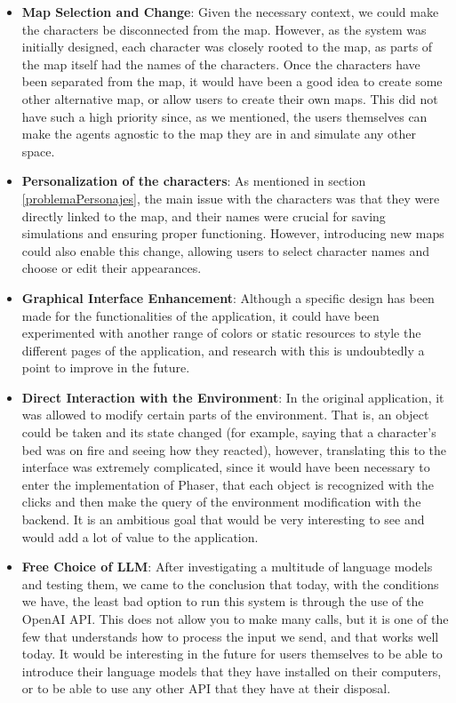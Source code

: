\begin{itemize}
	\item \textbf{Map Selection and Change}: Given the necessary context, we could make the characters be disconnected from the map. However, as the system was initially designed, each character was closely rooted to the map, as parts of the map itself had the names of the characters. Once the characters have been separated from the map, it would have been a good idea to create some other alternative map, or allow users to create their own maps. This did not have such a high priority since, as we mentioned, the users themselves can make the agents agnostic to the map they are in and simulate any other space.
	
	\item \textbf{Personalization of the characters}: As mentioned in section \ref{problemaPersonajes}, the main issue with the characters was that they were directly linked to the map, and their names were crucial for saving simulations and ensuring proper functioning. However, introducing new maps could also enable this change, allowing users to select character names and choose or edit their appearances.
	
	\item \textbf{Graphical Interface Enhancement}: Although a specific design has been made for the functionalities of the application, it could have been experimented with another range of colors or static resources to style the different pages of the application, and research with this is undoubtedly a point to improve in the future.
	
	\item \textbf{Direct Interaction with the Environment}: In the original application, it was allowed to modify certain parts of the environment. That is, an object could be taken and its state changed (for example, saying that a character's bed was on fire and seeing how they reacted), however, translating this to the interface was extremely complicated, since it would have been necessary to enter the implementation of Phaser, that each object is recognized with the clicks and then make the query of the environment modification with the backend. It is an ambitious goal that would be very interesting to see and would add a lot of value to the application.
	
	\item \textbf{Free Choice of LLM}: After investigating a multitude of language models and testing them, we came to the conclusion that today, with the conditions we have, the least bad option to run this system is through the use of the OpenAI API. This does not allow you to make many calls, but it is one of the few that understands how to process the input we send, and that works well today. It would be interesting in the future for users themselves to be able to introduce their language models that they have installed on their computers, or to be able to use any other API that they have at their disposal.
	

\end{itemize}
